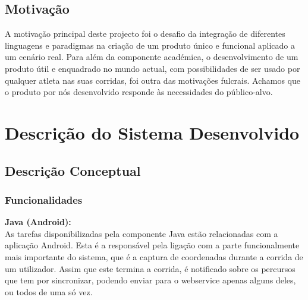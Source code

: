 \documentclass[15pt,a4paper]{article}
\begin{document}
\subsection{Motivação}

A motivação principal deste projecto foi o desafio da integração de diferentes linguagens e paradigmas na criação de um produto único e funcional aplicado a um cenário real. 
Para além da componente académica, o desenvolvimento de um produto útil e enquadrado no mundo actual, com possibilidades de ser usado por qualquer atleta nas suas corridas, foi outra das motivações fulcrais. Achamos que o produto por nós desenvolvido responde às necessidades do público-alvo.


\newpage
\section{Descrição do Sistema Desenvolvido}

\subsection{Descrição Conceptual}

\subsubsection{Funcionalidades}

\textbf{Java (Android):}
\\

As tarefas disponibilizadas pela componente Java estão relacionadas com a aplicação Android. Esta é a responsável pela ligação com a parte funcionalmente mais importante do sistema, que é a captura de coordenadas durante a corrida de um utilizador. Assim que este termina a corrida, é notificado sobre os percursos que tem por sincronizar, podendo enviar para o webservice apenas alguns deles, ou todos de uma só vez.
\end{document}
